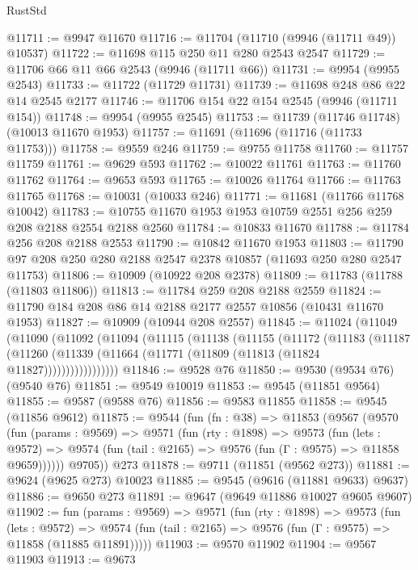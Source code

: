 \begin{lexlean}{RustStd}
\begin{coremodule}
@11711 := @9947 @11670
@11716 := @11704 (@11710 (@9946 (@11711 @49)) @10537)
@11722 := @11698 @115 @250 @11 @280 @2543 @2547
@11729 := @11706 @66 @11 @66 @2543 (@9946 (@11711 @66))
@11731 := @9954 (@9955 @2543)
@11733 := @11722 (@11729 @11731)
@11739 := @11698 @248 @86 @22 @14 @2545 @2177
@11746 := @11706 @154 @22 @154 @2545 (@9946 (@11711 @154))
@11748 := @9954 (@9955 @2545)
@11753 := @11739 (@11746 @11748) (@10013 @11670 @1953)
@11757 := @11691 (@11696 (@11716 (@11733 @11753)))
@11758 := @9559 @246
@11759 := @9755 @11758
@11760 := @11757 @11759
@11761 := @9629 @593
@11762 := @10022 @11761
@11763 := @11760 @11762
@11764 := @9653 @593
@11765 := @10026 @11764
@11766 := @11763 @11765
@11768 := @10031 (@10033 @246)
@11771 := @11681 (@11766 @11768 @10042)
@11783 := @10755 @11670 @1953 @1953 @10759 @2551 @256 @259 @208 @2188 @2554 @2188 @2560
@11784 := @10833 @11670
@11788 := @11784 @256 @208 @2188 @2553
@11790 := @10842 @11670 @1953
@11803 := @11790 @97 @208 @250 @280 @2188 @2547 @2378 @10857 (@11693 @250 @280 @2547 @11753)
@11806 := @10909 (@10922 @208 @2378)
@11809 := @11783 (@11788 (@11803 @11806))
@11813 := @11784 @259 @208 @2188 @2559
@11824 := @11790 @184 @208 @86 @14 @2188 @2177 @2557 @10856 (@10431 @11670 @1953)
@11827 := @10909 (@10944 @208 @2557)
@11845 := @11024
    (@11049
      (@11090
        (@11092
          (@11094
            (@11115
              (@11138
                (@11155
                  (@11172
                    (@11183
                      (@11187
                        (@11260
                          (@11339 (@11664 (@11771 (@11809 (@11813 (@11824 @11827)))))))))))))))))
@11846 := @9528 @76
@11850 := @9530 (@9534 @76) (@9540 @76)
@11851 := @9549 @10019
@11853 := @9545 (@11851 @9564)
@11855 := @9587 (@9588 @76)
@11856 := @9583 @11855
@11858 := @9545 (@11856 @9612)
@11875 := @9544
    (fun (fn : @38) =>
    @11853
      (@9567
        (@9570
          (fun (params : @9569) =>
          @9571
            (fun (rty : @1898) =>
            @9573
              (fun (lets : @9572) =>
              @9574 (fun (tail : @2165) => @9576 (fun (Γ : @9575) => @11858 @9659))))))
        @9705))
    @273
@11878 := @9711 (@11851 (@9562 @273))
@11881 := @9624 (@9625 @273) @10023
@11885 := @9545 (@9616 (@11881 @9633) @9637)
@11886 := @9650 @273
@11891 := @9647 (@9649 @11886 @10027 @9605 @9607)
@11902 := fun (params : @9569) =>
  @9571
    (fun (rty : @1898) =>
    @9573
      (fun (lets : @9572) =>
      @9574 (fun (tail : @2165) => @9576 (fun (Γ : @9575) => @11858 (@11885 @11891)))))
@11903 := @9570 @11902
@11904 := @9567 @11903
@11913 := @9673

\end{coremodule}
\end{lexlean}
